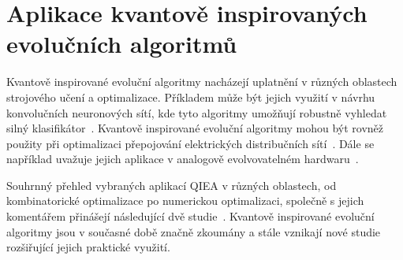 \section{Aplikace kvantově inspirovaných evolučních algoritmů}
Kvantově inspirované evoluční algoritmy nacházejí uplatnění v různých oblastech strojového učení a optimalizace. 
Příkladem může být jejich využití v návrhu konvolučních neuronových sítí, kde tyto algoritmy umožňují robustně vyhledat silný klasifikátor~\cite{QIEA-CNN}. 
Kvantově inspirované evoluční algoritmy mohou být rovněž použity při optimalizaci přepojování elektrických distribučních sítí~\cite{QIEA-net}. 
Dále se například uvažuje jejich aplikace v analogově evolvovatelném hardwaru~\cite{QIEA-EHW}. 

Souhrnný přehled vybraných aplikací QIEA v různých oblastech, od kombinatorické optimalizace po numerickou optimalizaci, společně s jejich komentářem přinášejí následující dvě studie~\cite{QIEA-survey1, QIEA-survey2}. 
Kvantově inspirované evoluční algoritmy jsou v současné době značně zkoumány a stále vznikají nové studie rozšiřující jejich praktické využití. 
